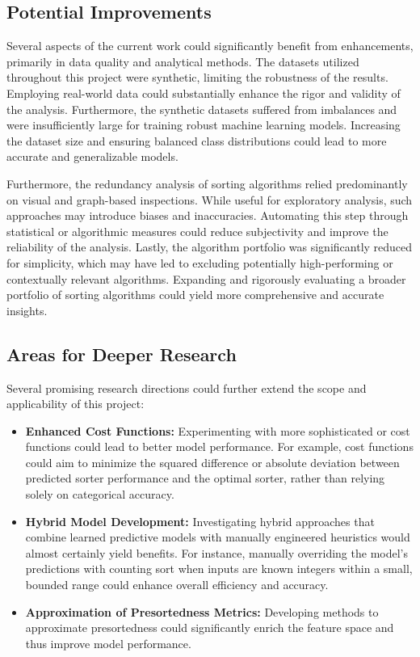 \documentclass[twocolumn]{article}
\newcommand{\vsp}{\vspace{0.5em}}
\begin{document}
\subsection{Potential Improvements}
Several aspects of the current work could significantly benefit from enhancements, primarily in data quality and analytical methods. The datasets utilized throughout this project were synthetic, limiting the robustness of the results. Employing real-world data could substantially enhance the rigor and validity of the analysis. Furthermore, the synthetic datasets suffered from imbalances and were insufficiently large for training robust machine learning models. Increasing the dataset size and ensuring balanced class distributions could lead to more accurate and generalizable models.

Furthermore, the redundancy analysis of sorting algorithms relied predominantly on visual and graph-based inspections. While useful for exploratory analysis, such approaches may introduce biases and inaccuracies. Automating this step through statistical or algorithmic measures could reduce subjectivity and improve the reliability of the analysis. Lastly, the algorithm portfolio was significantly reduced for simplicity, which may have led to excluding potentially high-performing or contextually relevant algorithms. Expanding and rigorously evaluating a broader portfolio of sorting algorithms could yield more comprehensive and accurate insights.

\subsection{Areas for Deeper Research}
Several promising research directions could further extend the scope and applicability of this project:

\begin{itemize}
    \item \textbf{Enhanced Cost Functions:} Experimenting with more sophisticated or cost functions could lead to better model performance. For example, cost functions could aim to minimize the squared difference or absolute deviation between predicted sorter performance and the optimal sorter, rather than relying solely on categorical accuracy. 

    \item \textbf{Hybrid Model Development:} Investigating hybrid approaches that combine learned predictive models with manually engineered heuristics would almost certainly yield benefits. For instance, manually overriding the model's predictions with counting sort when inputs are known integers within a small, bounded range could enhance overall efficiency and accuracy.

    \vsp 

    \item \textbf{Approximation of Presortedness Metrics:} Developing methods to approximate presortedness could significantly enrich the feature space and thus improve model performance.

\end{itemize}
\end{document}

